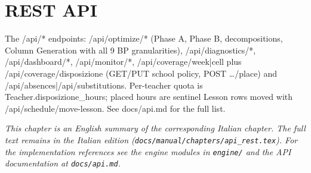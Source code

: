 \chapter{REST API}
\label{ch:api_rest_en}

The /api/* endpoints: /api/optimize/* (Phase A, Phase B, decompositions, Column Generation with all 9 BP granularities), /api/diagnostics/*, /api/dashboard/*, /api/monitor/*, /api/coverage/week|cell plus /api/coverage/disposizione (GET/PUT school policy, POST \ldots/place) and /api/absences|/api/substitutions. Per-teacher quota is Teacher.disposizione\_hours; placed hours are sentinel Lesson rows moved with /api/schedule/move-lesson. See docs/api.md for the full list.

\medskip
\noindent
\textit{This chapter is an English summary of the corresponding Italian chapter. The full text remains in the Italian edition (\texttt{docs/manual/chapters/api\_rest.tex}). For the implementation references see the engine modules in \texttt{engine/} and the API documentation at \texttt{docs/api.md}.}
